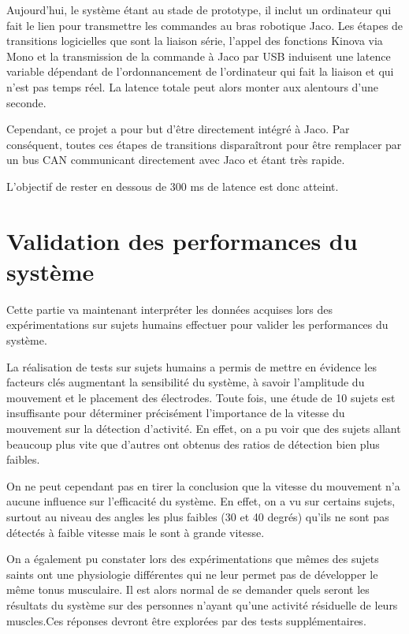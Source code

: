 \documentclass[letterpaper, twoside, 12pt, memoire, creativecommons, hyperref]{thETS}
\begin{document}
Aujourd'hui, le système étant au stade de prototype, il inclut un ordinateur qui fait le lien pour transmettre les commandes au bras robotique Jaco. Les étapes de transitions logicielles que sont la liaison série, l'appel des fonctions Kinova via Mono et la transmission de la commande à Jaco par USB induisent une latence variable dépendant de l'ordonnancement de l'ordinateur qui fait la liaison et qui n'est pas temps réel. La latence totale peut alors monter aux alentours d'une seconde. 

Cependant, ce projet a pour but d'être directement intégré à Jaco. Par conséquent, toutes ces étapes de transitions disparaîtront pour être remplacer par un bus CAN communicant directement avec Jaco et étant très rapide. 

L'objectif de rester en dessous de 300 ms de latence est donc atteint.

\section{Validation des performances du système}

Cette partie va maintenant interpréter les données acquises lors des expérimentations sur sujets humains effectuer pour valider les performances du système. 

La réalisation de tests sur sujets humains a permis de mettre en évidence les facteurs clés augmentant la sensibilité du système, à savoir l'amplitude du mouvement et le placement des électrodes. Toute fois, une étude de 10 sujets est insuffisante pour déterminer précisément l'importance de la vitesse du mouvement sur la détection d'activité. En effet, on a pu voir que des sujets allant beaucoup plus vite que d'autres ont obtenus des ratios de détection bien plus faibles.

On ne peut cependant pas en tirer la conclusion que la vitesse du mouvement n'a aucune influence sur l'efficacité du système. En effet, on a vu sur certains sujets, surtout au niveau des angles les plus faibles (30 et 40 degrés) qu'ils ne sont pas détectés à faible vitesse mais le sont à grande vitesse.

On a également pu constater lors des expérimentations que mêmes des sujets saints ont une physiologie différentes qui ne leur permet pas de développer le même tonus musculaire. Il est alors normal de se demander quels seront les résultats du système sur des personnes n'ayant qu'une activité résiduelle de leurs muscles.Ces réponses devront être explorées par des tests supplémentaires.
\end{document}
